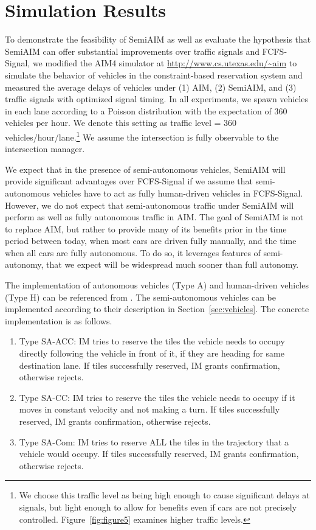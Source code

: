 \section{Simulation Results}

To demonstrate the feasibility of SemiAIM as well as evaluate the
hypothesis that SemiAIM can offer substantial improvements over
traffic signals and FCFS-Signal, we modified the AIM4 simulator at
\url{http://www.cs.utexas.edu/~aim} to simulate the behavior of
vehicles in the constraint-based reservation system and measured the
average delays of vehicles under (1) AIM, (2) SemiAIM, and (3) traffic
signals with optimized signal timing. In all experiments,
we spawn vehicles in each lane according to a Poisson distribution with the
expectation of 360 vehicles per hour. We denote this setting as
traffic level = 360 vehicles/hour/lane.\footnote{We choose this
traffic level as being high enough to cause significant delays at
signals, but light enough to allow for benefits even if cars are not
precisely controlled. Figure~\ref{fig:figure5} examines higher traffic
levels.} We assume the intersection is fully observable to the intersection
manager.

We expect that in the presence of semi-autonomous vehicles, SemiAIM
will provide significant advantages over FCFS-Signal if we assume that
semi-autonomous vehicles have to act as fully human-driven vehicles in
FCFS-Signal.  However, we do not expect that semi-autonomous traffic
under SemiAIM will perform as well as fully autonomous traffic in AIM.
The goal of SemiAIM is not to replace AIM, but rather to provide many
of its benefits prior in the time period between today, when most cars
are driven fully manually, and the time when all cars are fully
autonomous.  To do so, it leverages features of semi-autonomy, that we
expect will be widespread much sooner than full autonomy.

The implementation of autonomous vehicles (Type A) and human-driven
vehicles (Type H) can be referenced from
\cite{bib:Dresner08Multiagent}. The semi-autonomous vehicles can be
implemented according to their description in
Section~\ref{sec:vehicles}. The concrete implementation is as follows.

\begin{enumerate}

\item{Type SA-ACC: IM tries to reserve the tiles the vehicle needs to
occupy directly following the vehicle in front of it, if they are
heading for same destination lane. If tiles successfully reserved,
IM grants confirmation, otherwise rejects.}

\item{Type SA-CC: IM tries to reserve the tiles the vehicle needs to
occupy if it moves in constant velocity and not making a turn. If
tiles successfully reserved, IM grants confirmation, otherwise
rejects.}
 
\item{Type SA-Com: IM tries to reserve ALL the tiles in the trajectory
that a vehicle would occupy. If tiles successfully reserved, IM
grants confirmation, otherwise rejects.}

\end{enumerate}

